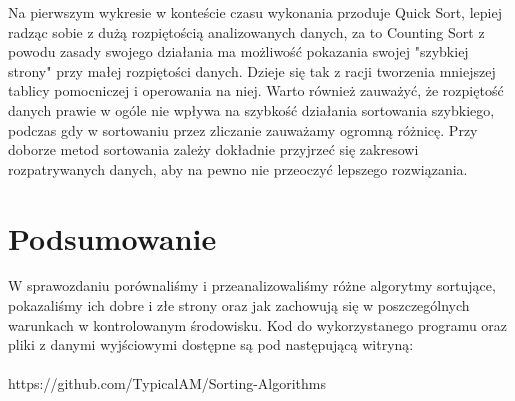 \documentclass{article}
\begin{document}
Na pierwszym wykresie w konteście czasu wykonania przoduje Quick Sort, lepiej radząc sobie z dużą rozpiętością analizowanych danych, za to Counting Sort z powodu zasady swojego działania ma możliwość pokazania swojej "szybkiej strony" przy małej rozpiętości danych. Dzieje się tak z racji tworzenia mniejszej tablicy pomocniczej i operowania na niej. Warto również zauważyć, że rozpiętość danych prawie w ogóle nie wpływa na szybkość działania sortowania szybkiego, podczas gdy w sortowaniu przez zliczanie zauważamy ogromną różnicę. Przy doborze metod sortowania zależy dokładnie przyjrzeć się zakresowi rozpatrywanych danych, aby na pewno nie przeoczyć lepszego rozwiązania.

\section{Podsumowanie}

W sprawozdaniu porównaliśmy i przeanalizowaliśmy różne algorytmy sortujące, pokazaliśmy ich dobre i złe strony oraz jak zachowują się w poszczególnych warunkach w kontrolowanym środowisku. Kod do wykorzystanego programu oraz pliki z danymi wyjściowymi dostępne są pod następującą witryną: \\\\
https://github.com/TypicalAM/Sorting-Algorithms
\end{document}
